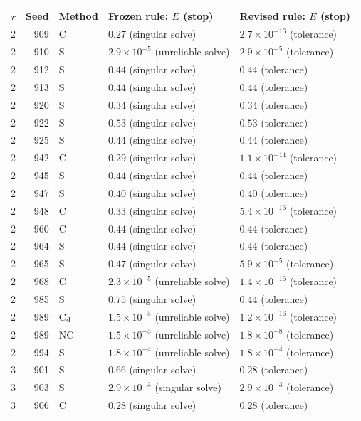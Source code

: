 \begin{tabular}{@{}rrl ll@{}}
\toprule
$r$ & Seed & Method & Frozen rule: $E$ (stop) & Revised rule: $E$ (stop)\\
\midrule
2 & 909 & C & $0.27$ (singular solve) & $2.7\times10^{-16}$ (tolerance)\\
2 & 910 & S & $2.9\times10^{-5}$ (unreliable solve) & $2.9\times10^{-5}$ (tolerance)\\
2 & 912 & S & $0.44$ (singular solve) & $0.44$ (tolerance)\\
2 & 913 & S & $0.44$ (singular solve) & $0.44$ (tolerance)\\
2 & 920 & S & $0.34$ (singular solve) & $0.34$ (tolerance)\\
2 & 922 & S & $0.53$ (singular solve) & $0.53$ (tolerance)\\
2 & 925 & S & $0.44$ (singular solve) & $0.44$ (tolerance)\\
2 & 942 & C & $0.29$ (singular solve) & $1.1\times10^{-14}$ (tolerance)\\
2 & 945 & S & $0.44$ (singular solve) & $0.44$ (tolerance)\\
2 & 947 & S & $0.40$ (singular solve) & $0.40$ (tolerance)\\
2 & 948 & C & $0.33$ (singular solve) & $5.4\times10^{-16}$ (tolerance)\\
2 & 960 & C & $0.44$ (singular solve) & $0.44$ (tolerance)\\
2 & 964 & S & $0.44$ (singular solve) & $0.44$ (tolerance)\\
2 & 965 & S & $0.47$ (singular solve) & $5.9\times10^{-5}$ (tolerance)\\
2 & 968 & C & $2.3\times10^{-5}$ (unreliable solve) & $1.4\times10^{-16}$ (tolerance)\\
2 & 985 & S & $0.75$ (singular solve) & $0.44$ (tolerance)\\
2 & 989 & C$_{\rm d}$ & $1.5\times10^{-5}$ (unreliable solve) & $1.2\times10^{-16}$ (tolerance)\\
2 & 989 & NC & $1.5\times10^{-5}$ (unreliable solve) & $1.8\times10^{-8}$ (tolerance)\\
2 & 994 & S & $1.8\times10^{-4}$ (unreliable solve) & $1.8\times10^{-4}$ (tolerance)\\
3 & 901 & S & $0.66$ (singular solve) & $0.28$ (tolerance)\\
3 & 903 & S & $2.9\times10^{-3}$ (singular solve) & $2.9\times10^{-3}$ (tolerance)\\
3 & 906 & C & $0.28$ (singular solve) & $0.28$ (tolerance)\\

\end{tabular}

